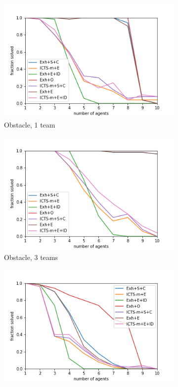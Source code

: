 \documentclass[english]{article}
\begin{document}
\begin{figure}
\begin{subfigure}{0.49\textwidth}
		\centering
		\includegraphics[width=\linewidth]{img/results/obstacle-1-p}
		\caption{Obstacle, 1 team}
		\label{fig:obstacle1}
	\end{subfigure}
	\begin{subfigure}{0.49\textwidth}
		\centering
		\includegraphics[width=\linewidth]{img/results/obstacle-3-p}
		\caption{Obstacle, 3 teams}
		\label{fig:obstacle3}
	\end{subfigure}
	\begin{subfigure}{0.49\textwidth}
		\centering
		\includegraphics[width=\linewidth]{img/results/maze-1-p}

\end{subfigure}
\end{figure}
\end{document}
